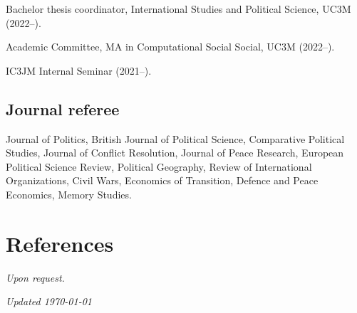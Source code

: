 \documentclass[a4paper, 12pt]{article}
\begin{document}
\noindent
Bachelor thesis coordinator, International Studies and Political Science, UC3M (2022--).

\noindent
Academic Committee, MA in Computational Social Social, UC3M (2022--).

\noindent
IC3JM Internal Seminar (2021--).

\subsection*{Journal referee}

Journal of Politics, British Journal of Political Science, Comparative Political Studies, Journal of Conflict Resolution, Journal of Peace Research, European Political Science Review, Political Geography, Review of International Organizations, Civil Wars, Economics of Transition, Defence and Peace Economics, Memory Studies.


\section*{References}

\textit{Upon request.}

%
%
%

\vfill

\noindent
\flushright
{\small\it Updated \monthdate\today}
\end{document}
